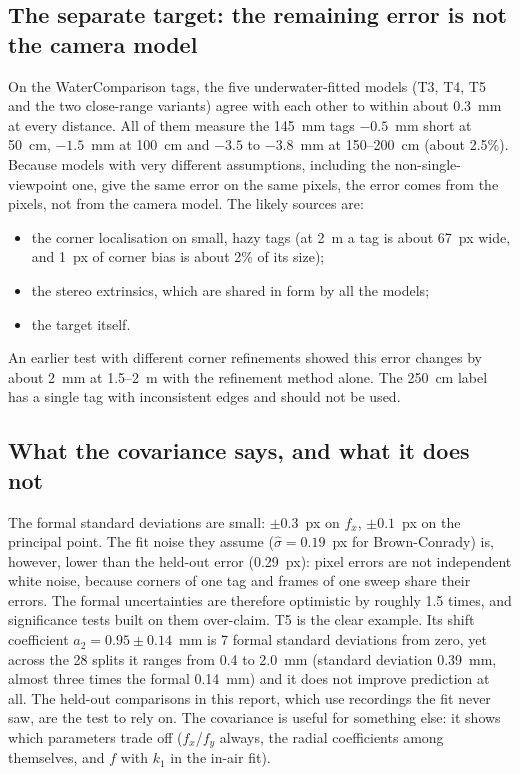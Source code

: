 \subsection{The separate target: the remaining error is not the camera model}
On the WaterComparison tags, the five underwater-fitted models (T3, T4, T5 and the two close-range
variants) agree with each other to within about 0.3~mm at every distance. All of them measure the 145~mm
tags $-0.5$~mm short at 50~cm, $-1.5$~mm at 100~cm and $-3.5$ to $-3.8$~mm at 150--200~cm (about 2.5\%).
Because models with very different assumptions, including the non-single-viewpoint one, give the same error
on the same pixels, the error comes from the pixels, not from the camera model. The likely sources are:
\begin{itemize}
\item the corner localisation on small, hazy tags (at 2~m a tag is about 67~px wide, and 1~px of corner
bias is about 2\% of its size);
\item the stereo extrinsics, which are shared in form by all the models;
\item the target itself.
\end{itemize}
An earlier test with different corner refinements showed this error changes by about 2~mm at 1.5--2~m with
the refinement method alone. The 250~cm label has a single tag with inconsistent edges and should not be
used.

\subsection{What the covariance says, and what it does not}
The formal standard deviations are small: $\pm0.3$~px on $f_x$, $\pm0.1$~px on the principal point. The fit
noise they assume ($\hat\sigma = 0.19$~px for Brown-Conrady) is, however, lower than the held-out error
(0.29~px): pixel errors are not independent white noise, because corners of one tag and frames of one
sweep share their errors. The formal uncertainties are therefore optimistic by roughly 1.5 times, and
significance tests built on them over-claim. T5 is the clear example. Its shift coefficient
$a_2 = 0.95 \pm 0.14$~mm is 7 formal standard deviations from zero, yet across the 28 splits it ranges from
0.4 to 2.0~mm (standard deviation 0.39~mm, almost three times the formal 0.14~mm) and it does not improve
prediction at all. The held-out comparisons in this report, which use
recordings the fit never saw, are the test to rely on. The covariance is useful for something else: it shows
which parameters trade off ($f_x$/$f_y$ always, the radial coefficients among themselves, and $f$ with $k_1$
in the in-air fit).

